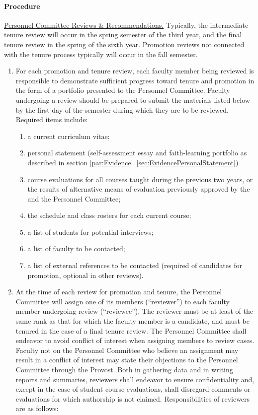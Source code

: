 			\paragraph{Procedure}
				\label{sec:PromotionEvaluationProcedure}
				\underline{Personnel Committee Reviews \& Recommendations.}  Typically, the intermediate tenure review will occur in the spring semester of the third year, and the final tenure review in the spring of the sixth year.  Promotion reviews not connected with the tenure process typically will occur in the fall semester.
				\begin{enumerate}[label=\alph*)]
					\item{For each promotion and tenure review, each faculty member being reviewed is responsible to demonstrate sufficient progress toward tenure and promotion in the form of a portfolio presented to the Personnel Committee.
						Faculty undergoing a review should be prepared to submit the materials listed below by the first day of the semester during which they are to be reviewed.
						Required items include:
						\begin{enumerate}[label=\arabic*)]
							\item{a current curriculum vitae;}
							\item{personal statement (self-assessment essay and faith-learning portfolio as described in section
								\ref{par:Evidence}~\ref{sec:EvidencePersonalStatement})}
							\item{course evaluations for all courses taught during the previous two years, or the results of alternative means of evaluation previously approved by the and the Personnel Committee;}
							\item{the schedule and class rosters for each current course;}
							\item{a list of students for potential interviews;}
							\item{a list of faculty to be contacted;}
							\item{a list of external references to be contacted (required of candidates for promotion, optional in other reviews).}
						\end{enumerate}
					}
					\item{At the time of each review for promotion and tenure, the Personnel Committee will assign one of its members (``reviewer'') to each faculty member undergoing review (``reviewee'').  The reviewer must be at least of the same rank as that for which the faculty member is a candidate, and must be tenured in the case of a final tenure review.  The Personnel Committee shall endeavor to avoid conflict of interest when assigning members to review cases.  Faculty not on the Personnel Committee who believe an assignment may result in a conflict of interest may state their objections to the Personnel Committee through the Provost.  Both in gathering data and in writing reports and summaries, reviewers shall endeavor to ensure confidentiality and, except in the case of student course evaluations, shall disregard comments or evaluations for which authorship is not claimed.  Responsibilities of reviewers are as follows:
}
\end{enumerate}
